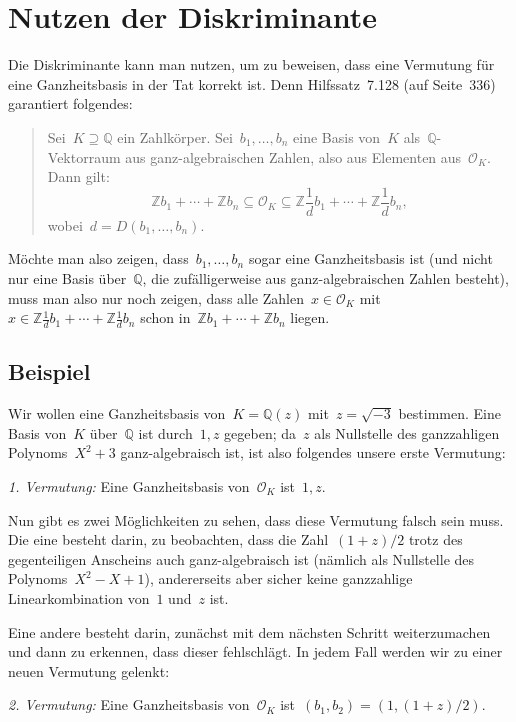 \documentclass[12pt,a4paper,ngerman]{scrartcl}
\newcommand{\Q}{\mathbb{Q}}
\newcommand{\Z}{\mathbb{Z}}
\theoremstyle{definition}
\theoremstyle{plain}
\theoremstyle{remark}
\begin{document}
\section*{Nutzen der Diskriminante}

Die Diskriminante kann man nutzen, um zu beweisen, dass eine Vermutung für eine
Ganzheitsbasis in der Tat korrekt ist. Denn Hilfssatz~7.128 (auf Seite~336)
garantiert folgendes:
\begin{quote}
Sei~$K \supseteq \Q$ ein Zahlkörper. Sei~$b_1,\ldots,b_n$ eine Basis von~$K$
als~$\Q$-Vektorraum aus ganz-algebraischen Zahlen, also aus Elementen
aus~$\mathcal{O}_K$. Dann gilt:
\[ \Z b_1 + \cdots + \Z b_n \subseteq \mathcal{O}_K \subseteq \Z \frac{1}{d}b_1
+ \cdots + \Z \frac{1}{d}b_n, \]
wobei~$d = D(b_1,\ldots,b_n)$.
\end{quote}

Möchte man also zeigen, dass~$b_1,\ldots,b_n$ sogar eine Ganzheitsbasis ist
(und nicht nur eine Basis über~$\Q$, die zufälligerweise aus ganz-algebraischen
Zahlen besteht), muss man also nur noch zeigen, dass alle Zahlen~$x \in
\mathcal{O}_K$ mit~$x \in \Z \frac{1}{d}b_1
+ \cdots + \Z \frac{1}{d}b_n$ schon in~$\Z b_1 + \cdots + \Z b_n$ liegen.


\subsection*{Beispiel}

Wir wollen eine Ganzheitsbasis von~$K = \Q(z)$ mit~$z = \sqrt{-3}$ bestimmen.
Eine Basis von~$K$ über~$\Q$ ist durch~$1, z$ gegeben; da~$z$ als Nullstelle
des ganzzahligen Polynoms~$X^2+3$ ganz-algebraisch ist, ist also folgendes
unsere erste Vermutung:

\emph{1. Vermutung:} Eine Ganzheitsbasis von~$\mathcal{O}_K$ ist~$1, z$.

Nun gibt es zwei Möglichkeiten zu sehen, dass diese Vermutung falsch sein muss.
Die eine besteht darin, zu beobachten, dass die Zahl~$(1+z)/2$ trotz des
gegenteiligen Anscheins auch ganz-algebraisch ist (nämlich als Nullstelle des
Polynoms~$X^2-X+1$), andererseits aber sicher keine ganzzahlige Linearkombination
von~$1$ und~$z$ ist.

Eine andere besteht darin, zunächst mit dem nächsten Schritt weiterzumachen und
dann zu erkennen, dass dieser fehlschlägt. In jedem Fall werden wir zu einer neuen
Vermutung gelenkt:

\emph{2. Vermutung:} Eine Ganzheitsbasis von~$\mathcal{O}_K$ ist~$(b_1,b_2) =
(1, (1+z)/2)$.
\end{document}
